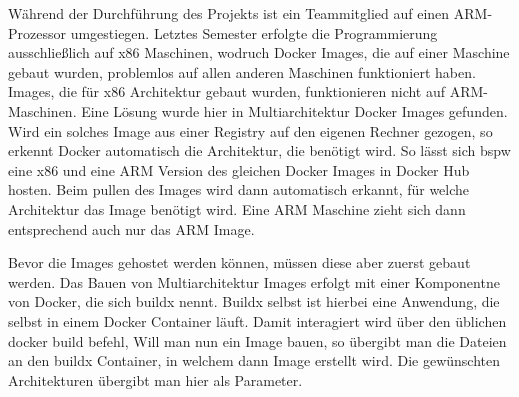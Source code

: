 Während der Durchführung des Projekts ist ein Teammitglied auf einen ARM-Prozessor umgestiegen.
Letztes Semester erfolgte die Programmierung ausschließlich auf x86 Maschinen, wodruch Docker Images, die auf einer Maschine gebaut wurden, problemlos auf allen anderen Maschinen funktioniert haben.
Images, die für x86 Architektur gebaut wurden, funktionieren nicht auf ARM-Maschinen.
Eine Lösung wurde hier in Multiarchitektur Docker Images gefunden.
Wird ein solches Image aus einer Registry auf den eigenen Rechner gezogen, so erkennt Docker automatisch die Architektur, die benötigt wird.
So lässt sich bspw eine x86 und eine ARM Version des gleichen Docker Images in Docker Hub hosten.
Beim pullen des Images wird dann automatisch erkannt, für welche Architektur das Image benötigt wird.
Eine ARM Maschine zieht sich dann entsprechend auch nur das ARM Image.

Bevor die Images gehostet werden können, müssen diese aber zuerst gebaut werden.
Das Bauen von Multiarchitektur Images erfolgt mit einer Komponentne von Docker, die sich buildx nennt.
Buildx selbst ist hierbei eine Anwendung, die selbst in einem Docker Container läuft.
Damit interagiert wird über den üblichen docker build befehl,
Will man nun ein Image bauen, so übergibt man die Dateien an den buildx Container, in welchem dann Image erstellt wird.
Die gewünschten Architekturen übergibt man hier als Parameter.
